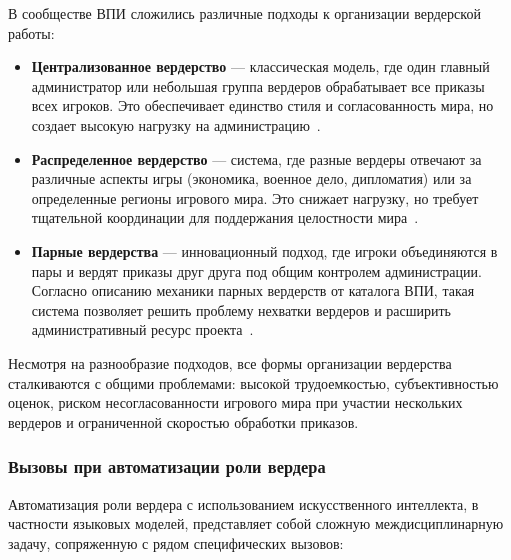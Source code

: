 В сообществе ВПИ сложились различные подходы к организации вердерской работы:

\begin{itemize}
    \item \textbf{Централизованное вердерство} — классическая модель, где один главный администратор или небольшая группа вердеров обрабатывает все приказы всех игроков. Это обеспечивает единство стиля и согласованность мира, но создает высокую нагрузку на администрацию~\cite{wpg-dtf}.

    \item \textbf{Распределенное вердерство} — система, где разные вердеры отвечают за различные аспекты игры (экономика, военное дело, дипломатия) или за определенные регионы игрового мира. Это снижает нагрузку, но требует тщательной координации для поддержания целостности мира~\cite{rpg-gamemaster}.

    \item \textbf{Парные вердерства} — инновационный подход, где игроки объединяются в пары и вердят приказы друг друга под общим контролем администрации. Согласно описанию механики парных вердерств от каталога ВПИ, такая система позволяет решить проблему нехватки вердеров и расширить административный ресурс проекта~\cite{paired-verdership}.
\end{itemize}

Несмотря на разнообразие подходов, все формы организации вердерства сталкиваются с общими проблемами: высокой трудоемкостью, субъективностью оценок, риском несогласованности игрового мира при участии нескольких вердеров и ограниченной скоростью обработки приказов.

\subsubsection{Вызовы при автоматизации роли вердера}

Автоматизация роли вердера с использованием искусственного интеллекта, в частности языковых моделей, представляет собой сложную междисциплинарную задачу, сопряженную с рядом специфических вызовов:

